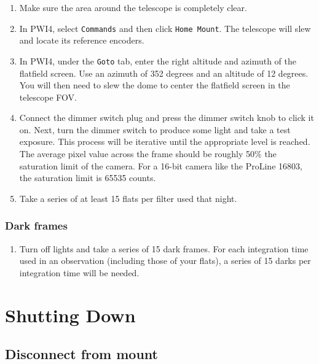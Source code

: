 \documentclass{article}
\begin{document}
	\begin{enumerate}
		
		\item Make sure the area around the telescope is completely clear.
		
		\item In PWI4, select \texttt{Commands} and then click \texttt{Home Mount}. The telescope will slew and locate its reference encoders.
		
		\item In PWI4, under the \texttt{Goto} tab, enter the right altitude and azimuth of the flatfield screen. Use an azimuth of 352 degrees and an altitude of 12 degrees. You will then need to slew the dome to center the flatfield screen in the telescope FOV.
		
		\item Connect the dimmer switch plug and press the dimmer switch knob to click it on. Next, turn the dimmer switch to produce some light and take a test exposure. This process will be iterative until the appropriate level is reached. The average pixel value across the frame should be roughly 50\% the saturation limit of the camera. For a 16-bit camera like the ProLine 16803, the saturation limit is 65535 counts.
		
		\item Take a series of at least 15 flats per filter used that night.
		
	\end{enumerate}

	\subsubsection{Dark frames}
	\label{sec:dark-frames}
	
	\begin{enumerate}
		
		\item Turn off lights and take a series of 15 dark frames. For each integration time used in an observation (including those of your flats), a series of 15 darks per integration time will be needed.
		
	\end{enumerate}
	
	\newpage
	\section{Shutting Down}
	\label{sec:shutting-down}
	
	\subsection{Disconnect from mount}
	\label{sec:disconnect-from-mount}
	
\end{document}
